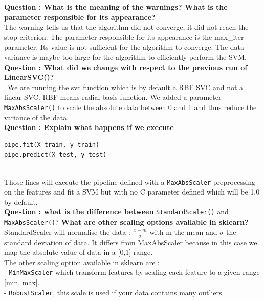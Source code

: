 \textbf{Question : What is the meaning of the warnings? What is the parameter responsible for its appearance?}\\

The warning tells us that the algorithm did not converge, it did not reach the stop criterion. The parameter responsible for its appearance is the max\_iter parameter. Its value is not sufficient for the algorithm to converge. The data variance is maybe too large for the algorithm to efficiently perform the SVM. \\

\textbf{Question : What did we change with respect to the previous run of LinearSVC()?} \\

 We are running the svc function which is by default a RBF SVC and not a linear SVC. RBF means radial basis function. We added a parameter \verb|MaxAbsScaler()| to scale the absolute data between 0 and 1 and thus reduce the variance of the data. \\

\textbf{Question : Explain what happens if we execute} 
\begin{verbatim}pipe.fit(X_train, y_train)
pipe.predict(X_test, y_test)\end{verbatim} \\
Those lines will execute the pipeline defined with a \verb|MaxAbsScaler|  preprocessing on the features and fit a SVM but with no C parameter defined which will be 1.0 by default.\\

\textbf{Question : what is the difference between} \verb|StandardScaler()| and \verb|MaxAbsScaler()|? \textbf{What are other scaling options available in sklearn? }\\

StandardScaler will normalise the data : $\frac{x-m}{\sigma}$ with m the mean and $\sigma$ the standard deviation of data. It differs from MaxAbsScaler  because in this case we map the absolute value of data in a [0,1] range.\\	
The other scaling option available in sklearn are : \\
- \verb|MinMaxScaler| which transform features by scaling each feature to a given range [min, max]. \\
- \verb|RobustScaler|, this scale is used if your data contains many outliers. \\ 

